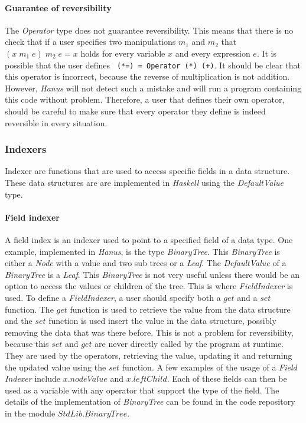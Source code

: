 \documentclass[12pt,a4paper]{article}
\begin{document}
    \paragraph{Guarantee of reversibility}
    The \textit{Operator} type does not guarantee reversibility. This means that there is no check that if a user specifies two manipulations $m_1$ and $m_2$ that $(x \; m_1 \; e) \; m_2 \; e = x$ holds for every variable $x$ and every expression $e$. It is possible that the user defines \texttt{ (*=) = Operator (*) (+)}. It should be clear that this operator is incorrect, because the reverse of multiplication is not addition. However, \textit{Hanus} will not detect such a mistake and will run a program containing this code without problem. Therefore, a user that defines their own operator, should be careful to make sure that every operator they define is indeed reversible in every situation. 
    \subsubsection{Indexers}    
    Indexer are functions that are used to access specific fields in a data structure. These data structures are are implemented in \textit{Haskell} using the \textit{DefaultValue} type.
    \paragraph{Field indexer}
    A field index is an indexer used to point to a specified field of a data type. One example, implemented in \textit{Hanus}, is the type \textit{BinaryTree}. This \textit{BinaryTree} is either a \textit{Node} with a value and two sub trees or a \textit{Leaf}. The \textit{DefaultValue} of a \textit{BinaryTree} is a \textit{Leaf}. This \textit{BinaryTree} is not very useful unless there would be an option to access the values or children of the tree. This is where \textit{FieldIndexer} is used. To define a \textit{FieldIndexer}, a user should specify both a $get$ and a $set$ function. The $get$ function is used to retrieve the value from the data structure and the $set$ function is used insert the value in the data structure, possibly removing the data that was there before. This is not a problem for reversibility, because this $set$ and $get$ are never directly called by the program at runtime. They are used by the operators, retrieving the value, updating it and returning the updated value using the $set$ function. A few examples of the usage of a \textit{Field Indexer} include $x.nodeValue$ and $x.leftChild$. Each of these fields can then be used as a variable with any operator that support the type of the field.  The details of the implementation of \textit{BinaryTree} can be found in the code repository in the module $StdLib.BinaryTree$.
\end{document}
